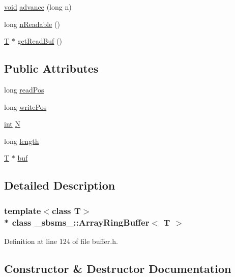 \begin{DoxyCompactItemize}
\item 
\hyperlink{sound_8c_ae35f5844602719cf66324f4de2a658b3}{void} \hyperlink{class__sbsms___1_1_array_ring_buffer_aa1e1eb6f7e94f39c7af6365e05d9d07d}{advance} (long n)
\item 
long \hyperlink{class__sbsms___1_1_array_ring_buffer_a1e6f49f44430e3c15447b446e9824c40}{n\+Readable} ()
\item 
\hyperlink{xmltchar_8h_a16a0f7e7053a679c9bf4289b441a2be7}{T} $\ast$ \hyperlink{class__sbsms___1_1_array_ring_buffer_a17a6a3fdd7759d84fb765e0d34d68e09}{get\+Read\+Buf} ()
\end{DoxyCompactItemize}
\subsection*{Public Attributes}
\begin{DoxyCompactItemize}
\item 
long \hyperlink{class__sbsms___1_1_array_ring_buffer_a3da6fb41e3943ed475c000caf8e89712}{read\+Pos}
\item 
long \hyperlink{class__sbsms___1_1_array_ring_buffer_a575d6c5414c4e4b5b7b884fc478184b1}{write\+Pos}
\item 
\hyperlink{xmltok_8h_a5a0d4a5641ce434f1d23533f2b2e6653}{int} \hyperlink{class__sbsms___1_1_array_ring_buffer_aae8ab83bf76f0e11476f7859677c2c5b}{N}
\item 
long \hyperlink{class__sbsms___1_1_array_ring_buffer_a2646b40a12c766f07d8057d7a2152238}{length}
\item 
\hyperlink{xmltchar_8h_a16a0f7e7053a679c9bf4289b441a2be7}{T} $\ast$ \hyperlink{class__sbsms___1_1_array_ring_buffer_a78818bd9b32d5c8c6317112414e055ab}{buf}
\end{DoxyCompactItemize}


\subsection{Detailed Description}
\subsubsection*{template$<$class T$>$\\*
class \+\_\+sbsms\+\_\+\+::\+Array\+Ring\+Buffer$<$ T $>$}



Definition at line 124 of file buffer.\+h.



\subsection{Constructor \& Destructor Documentation}
